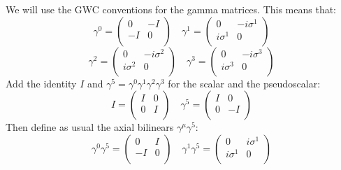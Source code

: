 \documentclass[a4paper,10pt]{article}
\begin{document}
We will use the GWC conventions for the gamma matrices. This means that:
\begin{displaymath}
 \gamma^{0} = \left(\begin{array}{cc}
 0 & -I \\
 -I & 0 \\
 \end{array}\right)
\quad \gamma^{1} = \left(\begin{array}{cc}
 0 & -i\sigma^{1} \\
 i\sigma^{1} & 0 \\
 \end{array}\right)
\end{displaymath}
\begin{displaymath}
\gamma^{2} = \left(\begin{array}{cc}
 0 & -i\sigma^{2} \\
 i\sigma^{2} & 0 \\
 \end{array}\right)
\quad \gamma^{3} = \left(\begin{array}{cc}
 0 & -i\sigma^{3} \\
 i\sigma^{3} & 0 \\
 \end{array}\right)
\end{displaymath}
Add the identity $I$ and $\gamma^{5}=\gamma^{0}\gamma^{1}\gamma^{2}\gamma^{3}$ for the scalar and the pseudoscalar:
\begin{displaymath}
 I = \left(\begin{array}{cc}
 I & 0 \\
 0 & I \\
 \end{array}\right)
\quad \gamma^{5} = \left(\begin{array}{cc}
 I & 0 \\
 0 & -I \\
 \end{array}\right)
\end{displaymath}
Then define as usual the axial bilinears $\gamma^{\mu}\gamma^{5}$:
\begin{displaymath}
 \gamma^{0}\gamma^{5} = \left(\begin{array}{cc}
 0 & I \\
 -I & 0 \\
 \end{array}\right)
\quad \gamma^{1}\gamma^{5} = \left(\begin{array}{cc}
 0 & i\sigma^{1} \\
 i\sigma^{1} & 0 \\
 \end{array}\right)
\end{displaymath}
\end{document}
